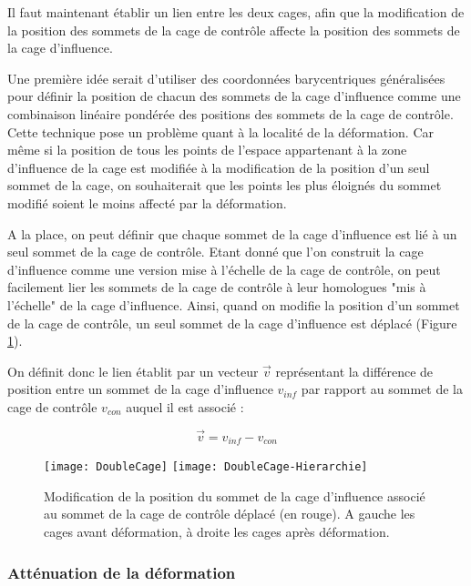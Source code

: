 Il faut maintenant établir un lien entre les deux cages, afin que la
modification de la position des sommets de la cage de contrôle affecte la
position des sommets de la cage d'influence.

Une première idée serait d'utiliser des coordonnées barycentriques
généralisées pour définir la position de chacun des sommets de la cage
d'influence comme une combinaison linéaire pondérée des positions des sommets
de la cage de contrôle. Cette technique pose un problème quant à la localité
de la déformation. Car même si  la position de tous les points de l'espace
appartenant à la zone d'influence de la cage est modifiée à la modification de
la position d'un seul sommet de la cage, on souhaiterait que les points les
plus éloignés du sommet modifié soient le moins affecté par la déformation.

A la place, on peut définir que chaque sommet de la cage d'influence est lié à
un seul sommet de la cage de contrôle. Etant donné que l'on construit la cage
d'influence comme une version mise à l'échelle de la cage de contrôle, on peut
facilement lier les sommets de la cage de contrôle à leur homologues "mis à
l'échelle" de la cage d'influence. Ainsi, quand on modifie la position d'un
sommet de la cage de contrôle, un seul sommet de la cage d'influence est
déplacé (Figure \ref{MelHie}).

On définit donc le lien établit par un vecteur $\overrightarrow{v}$
représentant la différence de position entre un sommet de la cage d'influence
$v_{inf}$ par rapport au sommet de la cage de contrôle $v_{con}$ auquel il est
associé :

\begin{displaymath}
  \overrightarrow{v} = v_{inf}-v_{con}
\end{displaymath}

\begin{figure}[ht]
\begin{center}
  \texttt{[image: DoubleCage]}
  \texttt{[image: DoubleCage-Hierarchie]}

  \caption{Modification de la position du sommet de la cage d'influence
associé au sommet de la cage de contrôle déplacé (en rouge). A gauche les
cages avant déformation, à droite les cages après déformation.}

  \label{MelHie}
\end{center}
\end{figure}

\subsubsection{Atténuation de la déformation}

